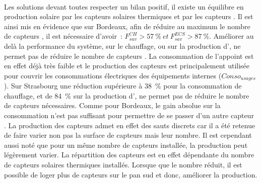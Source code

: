 \paragraph{} %
Les solutions devant toutes respecter un bilan positif, il existe un équilibre en
production solaire par les capteurs solaires thermiques et par les capteurs .
Il est ainsi mis en évidence que sur Bordeaux, afin de réduire au maximum le nombre
de capteurs , il est nécessaire d’avoir~:
$F_{sav}^{CH} > \SI{57}{\percent} \ et \ F_{sav}^{ECS} > \SI{87}{\percent}$.
Améliorer au delà la performance du système, sur le chauffage, ou sur la production d’,
ne permet pas de réduire le nombre de capteurs . La consommation de l’appoint
est en effet déjà très faible et le production des capteurs  est principalement
utilisée pour couvrir les consommations électriques des équipements internes ($Conso_{usages}$).
Sur Strasbourg une réduction supérieure à \SI{38}{\percent} pour la consommation de chauffage, et de
\SI{84}{\percent} sur la production d’, ne permet pas de réduire le nombre de capteurs  nécessaires.
Comme pour Bordeaux, le gain absolue sur la consommation n’est pas suffisant pour permettre de se passer d’un
autre capteur .
La production des capteurs  admet en effet des sauts discrets car il a été retenue de faire
varier non pas la surface de capteurs mais leur nombre. Il est cependant aussi
noté que pour un même nombre de capteurs installée, la production peut légèrement varier.
La répartition des capteurs  est en effet dépendante du nombre de capteurs
solaires thermiques installés. Lorsque que le nombre réduit, il est possible de loger plus
de capteurs  sur le pan sud et donc, améliorer la production.

